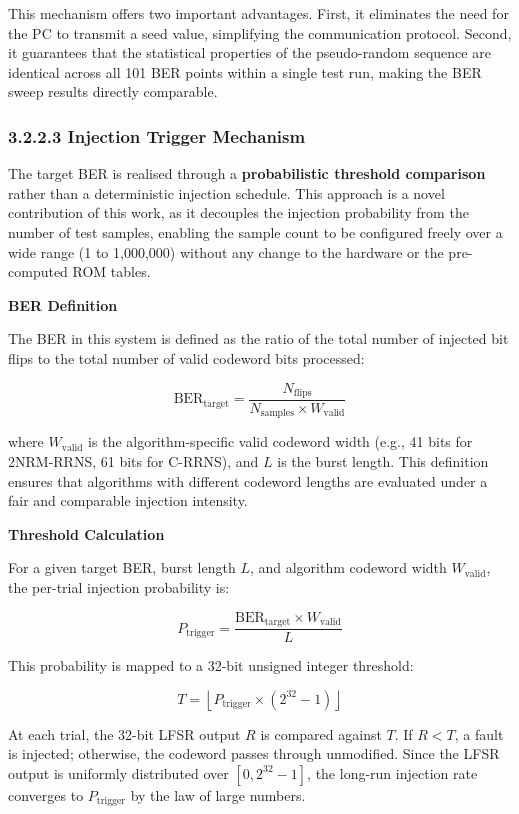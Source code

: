 \documentclass[
  12pt,
  a4paper]{report}
\begin{document}
This mechanism offers two important advantages. First, it eliminates the
need for the PC to transmit a seed value, simplifying the communication
protocol. Second, it guarantees that the statistical properties of the
pseudo-random sequence are identical across all 101 BER points within a
single test run, making the BER sweep results directly comparable.

\subsubsection{3.2.2.3 Injection Trigger
Mechanism}\label{injection-trigger-mechanism}

The target BER is realised through a \textbf{probabilistic threshold
comparison} rather than a deterministic injection schedule. This
approach is a novel contribution of this work, as it decouples the
injection probability from the number of test samples, enabling the
sample count to be configured freely over a wide range (1 to 1,000,000)
without any change to the hardware or the pre-computed ROM tables.

\textbf{BER Definition}

The BER in this system is defined as the ratio of the total number of
injected bit flips to the total number of valid codeword bits processed:

\[\text{BER}_{\text{target}} = \frac{N_{\text{flips}}}{N_{\text{samples}} \times W_{\text{valid}}}\]

where \(W_{\text{valid}}\) is the algorithm-specific valid codeword
width (e.g., 41 bits for 2NRM-RRNS, 61 bits for C-RRNS), and \(L\) is
the burst length. This definition ensures that algorithms with different
codeword lengths are evaluated under a fair and comparable injection
intensity.

\textbf{Threshold Calculation}

For a given target BER, burst length \(L\), and algorithm codeword width
\(W_{\text{valid}}\), the per-trial injection probability is:

\[P_{\text{trigger}} = \frac{\text{BER}_{\text{target}} \times W_{\text{valid}}}{L}\]

This probability is mapped to a 32-bit unsigned integer threshold:

\[T = \left\lfloor P_{\text{trigger}} \times (2^{32} - 1) \right\rfloor\]

At each trial, the 32-bit LFSR output \(R\) is compared against \(T\).
If \(R < T\), a fault is injected; otherwise, the codeword passes
through unmodified. Since the LFSR output is uniformly distributed over
\([0, 2^{32}-1]\), the long-run injection rate converges to
\(P_{\text{trigger}}\) by the law of large numbers.
\end{document}
